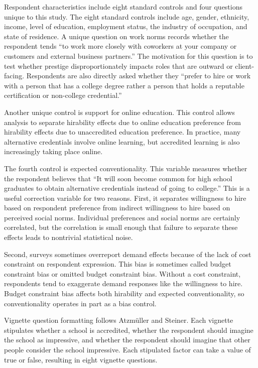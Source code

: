 Respondent characteristics include eight standard controls and four questions unique to this study.
The eight standard controls include
age, gender, ethnicity, income,
level of education, employment status, the industry of occupation, and state of residence.
A unique question on work norms records whether the respondent tends ``to work more closely with coworkers at your company or customers and external business partners.''
The motivation for this question is to test whether prestige disproportionately impacts roles that are outward or client-facing.
Respondents are also directly asked whether they
``prefer to hire or work with a person that has a college degree rather a person that holds a reputable certification or non-college credential.''

Another unique control is support for online education.
This control allows analysis to separate hirability effects due to online education preference
from hirability effects due to unaccredited education preference.
In practice, many alternative credentials involve online learning,
but accredited learning is also increasingly taking place online.

The fourth control is expected conventionality.
This variable measures whether the respondent believes that
``It will soon become common for high school graduates to obtain alternative credentials instead of going to college.''
This is a useful correction variable for two reasons.
First, it separates willingness to hire based on respondent preference
from indirect willingness to hire based on perceived social norms.
Individual preferences and social norms are certainly correlated,
but the correlation is small enough that failure to separate these effects leads to nontrivial statistical noise.

Second, surveys sometimes overreport demand effects because of the lack of cost constraint on respondent expression.
This bias is sometimes called budget constraint bias or omitted budget constraint bias\cite{ahlheim1998contingent, pachali2020omitted}.
Without a cost constraint, respondents tend to exaggerate demand responses like the willingness to hire.
Budget constraint bias affects both hirability and expected conventionality,
so conventionality operates in part as a bias control.

Vignette question formatting follows Atzm{\"u}ller and Steiner\cite{atzmuller2010experimental}.
Each vignette stipulates whether a school is accredited,
whether the respondent should imagine the school as impressive,
and whether the respondent should imagine that other people consider the school impressive.
Each stipulated factor can take a value of true or false,
resulting in eight vignette questions.

